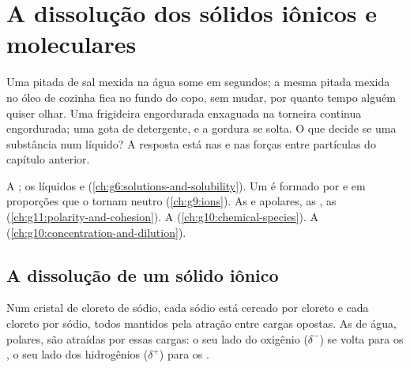 \chapter{A dissolução dos sólidos iônicos e moleculares}\label{ch:g11:dissolution}

Uma pitada de sal mexida na água some em segundos; a mesma pitada mexida
no óleo de cozinha fica no fundo do copo, sem mudar, por quanto tempo
alguém quiser olhar. Uma frigideira engordurada enxaguada na torneira
continua engordurada; uma gota de detergente, e a gordura se solta. O
que decide se uma substância  num líquido? A resposta está
nas  e nas forças entre partículas do capítulo anterior.

\begin{recall}
A ; os líquidos  e 
(\cref{ch:g6:solutions-and-solubility}). Um  é formado
por  e  em proporções que o tornam neutro
(\cref{ch:g9:ions}). As  e apolares, as , as 
(\cref{ch:g11:polarity-and-cohesion}). A 
(\cref{ch:g10:chemical-species}). A 
(\cref{ch:g10:concentration-and-dilution}).
\end{recall}

\section{A dissolução de um sólido iônico}

Num cristal de cloreto de sódio, cada  sódio  está cercado por
 cloreto  e cada  cloreto por  sódio, todos mantidos
pela atração entre cargas opostas. As  de água, polares, são
atraídas por essas cargas: o seu lado do oxigênio ($\delta^-$) se volta
para os , o seu lado dos hidrogênios ($\delta^+$) para os .

